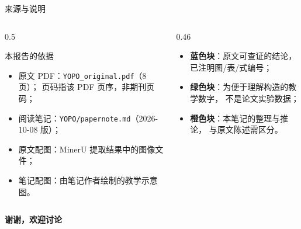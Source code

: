\begin{frame}{来源与说明}
  \small
  \begin{columns}[t]
    \begin{column}{0.5\textwidth}
      \begin{block}{本报告的依据}
        \footnotesize
        \begin{itemize}\tight
          \item 原文 PDF：\texttt{YOPO\_original.pdf}（8 页）；
                页码指该 PDF 页序，非期刊页码；
          \item 阅读笔记：\texttt{YOPO/papernote.md}（2026-10-08 版）；
          \item 原文配图：MinerU 提取结果中的图像文件；
          \item 笔记配图：由笔记作者绘制的教学示意图。
        \end{itemize}
      \end{block}
    \end{column}
    \begin{column}{0.46\textwidth}
      \begin{reading}[三类内容的标注]
        \footnotesize
        \begin{itemize}\tight
          \item \textbf{蓝色块}：原文可查证的结论，已注明图/表/式编号；
          \item \textbf{绿色块}：为便于理解构造的教学数字，
                不是论文实验数据；
          \item \textbf{橙色块}：本笔记的整理与推论，
                与原文陈述需区分。
        \end{itemize}
      \end{reading}
    \end{column}
  \end{columns}

  \vspace{0.4em}
  \begin{center}
    \Large\color{yopoblue}\bfseries 谢谢，欢迎讨论
  \end{center}
\end{frame}
